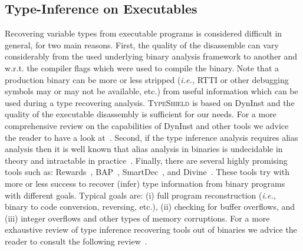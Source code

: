 \subsection{Type-Inference on Executables}
\label{Type-Inference on Executables}
Recovering variable types from executable programs
is considered difficult in general, for two main reasons.
First, the quality of the disassemble can vary considerably from the used underlying binary analysis
framework to another and w.r.t. the compiler flags which were used to compile the binary.
Note that a production binary can be more or less stripped (\textit{i.e.,} RTTI or other debugging symbols may or may not be available, etc.)
from useful information which can be used during a type recovering analysis.
\textsc{TypeShield} is based on DynInst and the quality of the executable disassembly is sufficient for our needs.
For a more comprehensive review on the capabilities of DynInst and other tools we
advice the reader to have a look at~\cite{andriesse:indepth}.
Second, if the type inference analysis requires alias analysis then it is well known that 
alias analysis in binaries is undecidable \cite{alias:undecidable} in theory and intractable 
in practice~\cite{alan:mycroft}.
Finally, there are several highly promising tools such as: Rewards~\cite{lin:rewards}, BAP~\cite{bap:brumley}, 
SmartDec~\cite{fokin:smartdec}, and Divine~\cite{divine:balakrishnan}.
These tools try with more or less success to recover (infer)
type information from binary programs with different goals.
Typical goals are: 
(i) full program reconstruction (\textit{i.e.,} binary to code conversion, reversing, etc.), 
(ii) checking for buffer overflows, and
(iii) integer overflows and other types of memory corruptions.
For a more exhaustive review of type inference recovering tools out of binaries we advice the reader
to consult the following review~\cite{caballero:inference}.


